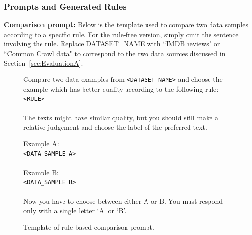 \documentclass{article}
\begin{document}
\subsubsection{Prompts and Generated Rules}\label{subsubsec:Appendix-EvalA-Prompts-Rules}
\textbf{Comparison prompt:}
Below is the template used to compare two data samples according to a specific rule. For the rule-free version, simply omit the sentence involving the rule. Replace DATASET\_NAME with ``IMDB reviews" or ``Common Crawl data" to correspond to the two data sources discussed in Section~\ref{sec:EvaluationA}.
\begin{figure}[H]
\centering
\small
\begin{tcolorbox}[colback=cyan!10!white, %
                  colframe=cyan!30!white, %
                  width=0.99\textwidth, %
                  arc=4mm, %
                  auto outer arc,
                  ]
Compare two data examples from \texttt{\color{red}<DATASET\_NAME>} and choose the example which has better quality according to the following rule:\\
\texttt{\color{red}<RULE>}\\
\\

The texts might have similar quality, but you should still make a relative judgement and choose the label of the preferred text.

Example A:\\
\texttt{\color{red}<DATA\_SAMPLE A>}\\\\

Example B:\\
\texttt{\color{red}<DATA\_SAMPLE B>}\\\\
Now you have to choose between either A or B. You must respond only with a single letter `A' or `B'.

\end{tcolorbox}
\caption{Template of rule-based comparison prompt.}
\label{tab:rule_comparison_prompt}
\end{figure}
\end{document}
